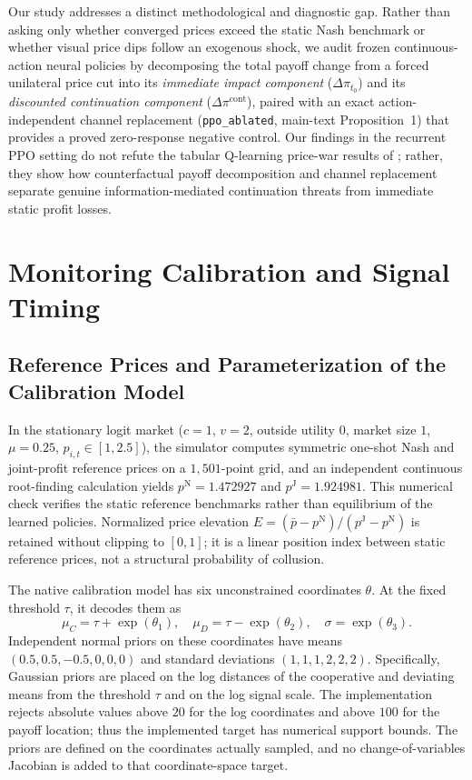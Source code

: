 \documentclass{article}
\begin{document}
Our study addresses a distinct methodological and diagnostic gap. Rather than asking only whether converged prices exceed the static Nash benchmark or whether visual price dips follow an exogenous shock, we audit frozen continuous-action neural policies by decomposing the total payoff change from a forced unilateral price cut into its \emph{immediate impact component} ($\Delta\pi_{t_0}$) and its \emph{discounted continuation component} ($\Delta\pi^{\mathrm{cont}}$), paired with an exact action-independent channel replacement (\texttt{ppo\_ablated}, main-text Proposition~1) that provides a proved zero-response negative control. Our findings in the recurrent PPO setting do not refute the tabular Q-learning price-war results of \citet{calvano2021algorithmic}; rather, they show how counterfactual payoff decomposition and channel replacement separate genuine information-mediated continuation threats from immediate static profit losses.

\section{Monitoring Calibration and Signal Timing}

\subsection{Reference Prices and Parameterization of the Calibration Model}

In the stationary logit market ($c=1$, $v=2$, outside utility $0$, market size $1$, $\mu=0.25$, $p_{i,t}\in[1,2.5]$), the simulator computes symmetric one-shot Nash and joint-profit reference prices on a $1{,}501$-point grid, and an independent continuous root-finding calculation yields $p^{\mathrm{N}} = 1.472927$ and $p^{\mathrm{J}} = 1.924981$. This numerical check verifies the static reference benchmarks rather than equilibrium of the learned policies. Normalized price elevation $E = (\bar{p}-p^{\mathrm{N}})/(p^{\mathrm{J}}-p^{\mathrm{N}})$ is retained without clipping to $[0,1]$; it is a linear position index between static reference prices, not a structural probability of collusion.

The native calibration model has six unconstrained coordinates $\theta$. At the fixed threshold $\tau$, it decodes them as
\[
\mu_C = \tau + \exp(\theta_1), \quad \mu_D = \tau - \exp(\theta_2), \quad \sigma = \exp(\theta_3).
\]
Independent normal priors on these coordinates have means $(0.5, 0.5, -0.5, 0, 0, 0)$ and standard deviations $(1, 1, 1, 2, 2, 2)$. Specifically, Gaussian priors are placed on the log distances of the cooperative and deviating means from the threshold $\tau$ and on the log signal scale. The implementation rejects absolute values above $20$ for the log coordinates and above $100$ for the payoff location; thus the implemented target has numerical support bounds. The priors are defined on the coordinates actually sampled, and no change-of-variables Jacobian is added to that coordinate-space target.
\end{document}
